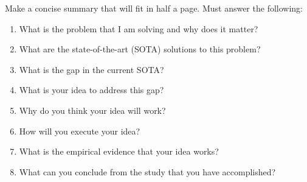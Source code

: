 
Make a concise summary that will fit in half a page. Must answer the following:
\begin{enumerate}
    \item What is the problem that I am solving and why does it matter?
    \item What are the state-of-the-art (SOTA) solutions to this problem?
    \item What is the gap in the current SOTA?
    \item What is your idea to address this gap?
    \item Why do you think your idea will work?
    \item How will you execute your idea?
    \item What is the empirical evidence that your idea works?
    \item What can you conclude from the study that you have accomplished?
\end{enumerate}
